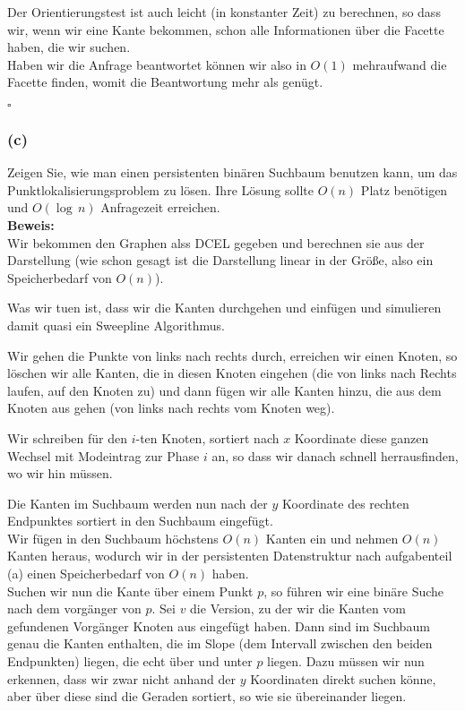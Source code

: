 \documentclass[11pt,a4paper,ngerman]{article}
\begin{document}
Der Orientierungstest ist auch leicht (in konstanter Zeit) zu berechnen, so dass wir, wenn wir eine Kante bekommen, schon alle Informationen über die
Facette haben, die wir suchen.\\

Haben wir die Anfrage beantwortet können wir also in $O(1)$ mehraufwand die Facette finden, womit die Beantwortung mehr als genügt.

\mbox{}\hfill$\square$

\subsubsection*{(c)}

Zeigen Sie, wie man einen persistenten binären Suchbaum benutzen kann, um das Punktlokalisierungsproblem zu lösen. Ihre Lösung sollte $O(n)$ Platz benötigen und $O(\log \, n)$ Anfragezeit erreichen.\\

\noindent\textbf{Beweis:}\\

Wir bekommen den Graphen alss DCEL gegeben und berechnen sie aus der Darstellung (wie schon gesagt ist die Darstellung linear in der Größe,
also ein Speicherbedarf von $O(n)$).

Was wir tuen ist, dass wir die Kanten durchgehen und einfügen und simulieren damit quasi ein Sweepline Algorithmus.

Wir gehen die Punkte von links nach rechts durch, erreichen wir einen Knoten, so löschen wir alle Kanten, die in diesen Knoten eingehen (die von links nach Rechts laufen, auf den Knoten zu) und dann fügen wir alle Kanten hinzu, die aus dem Knoten aus gehen (von links nach rechts vom Knoten weg).

Wir schreiben für den $i$-ten Knoten, sortiert nach $x$ Koordinate diese ganzen Wechsel mit Modeintrag zur Phase $i$ an, so dass wir danach schnell herrausfinden, wo wir hin müssen.

Die Kanten im Suchbaum werden nun nach der $y$ Koordinate des rechten Endpunktes sortiert in den Suchbaum eingefügt.\\
Wir fügen in den Suchbaum höchstens $O(n)$ Kanten ein und nehmen $O(n)$ Kanten heraus, wodurch wir in der persistenten Datenstruktur
nach aufgabenteil (a) einen Speicherbedarf von $O(n)$ haben.\\

Suchen wir nun die Kante über einem Punkt $p$, so führen wir eine binäre Suche nach dem vorgänger von $p$. Sei $v$ die Version, zu der wir die
Kanten vom gefundenen Vorgänger Knoten aus eingefügt haben.
Dann sind im Suchbaum genau die Kanten enthalten, die im Slope (dem Intervall zwischen den beiden Endpunkten) liegen, die echt über und unter $p$ liegen. Dazu müssen wir nun erkennen, dass wir zwar nicht anhand der $y$ Koordinaten direkt suchen könne, aber über diese sind die Geraden sortiert, so wie sie übereinander liegen.
\end{document}
